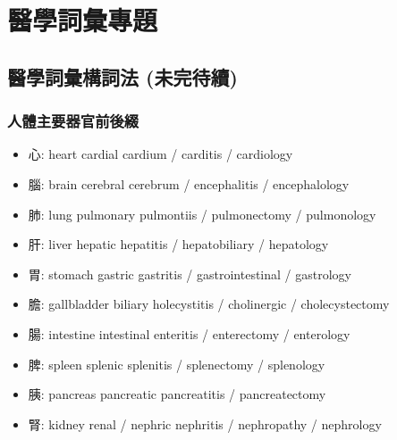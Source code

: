 \chapter{醫學詞彙專題}
\section{醫學詞彙構詞法 (未完待續)}
\subsection{人體主要器官前後綴}
\begin{itemize}
  \itemsep0em
  \item 心: heart  cardial cardium / carditis / cardiology
  \item 腦: brain  cerebral cerebrum / encephalitis / encephalology
  \item 肺: lung  pulmonary pulmontiis / pulmonectomy / pulmonology
  \item 肝: liver  hepatic hepatitis / hepatobiliary / hepatology
  \item 胃: stomach  gastric gastritis / gastrointestinal / gastrology
  \item 膽: gallbladder  biliary holecystitis / cholinergic / cholecystectomy
  \item 腸: intestine  intestinal enteritis / enterectomy / enterology
  \item 脾: spleen  splenic splenitis / splenectomy / splenology
  \item 胰: pancreas  pancreatic pancreatitis / pancreatectomy
  \item 腎: kidney  renal / nephric nephritis / nephropathy / nephrology
\end{itemize}


